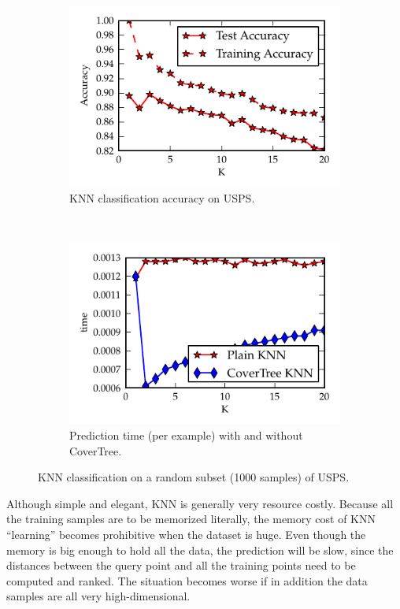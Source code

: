 \begin{figure}\centering
	\begin{subfigure}{.48\textwidth}
		\includegraphics{fig/multiclass/knn-accuracy}
		\caption{KNN classification accuracy on USPS.}
		\label{fig:mc-knn-acc}
	\end{subfigure}
	~
	\begin{subfigure}{.48\textwidth}
		\includegraphics{fig/multiclass/knn-time}
		\caption{Prediction time (per example) with and without CoverTree.}
		\label{fig:mc-knn-time}
	\end{subfigure}
	\caption{KNN classification on a random subset (1000 samples) of USPS.}
\end{figure}

Although simple and elegant, KNN is generally very resource costly. Because all
the training samples are to be memorized literally, the memory cost of KNN
``learning'' becomes prohibitive when the dataset is huge. Even though the
memory is big enough to hold all the data, the prediction will be slow, since
the distances between the query point and all the training points need to be
computed and ranked. The situation becomes worse if in addition the data
samples are all very high-dimensional.

